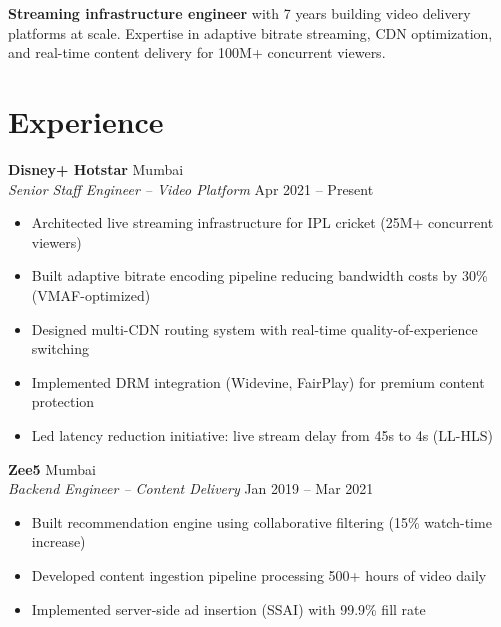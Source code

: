 \documentclass[10pt,letterpaper]{article}
\begin{document}
\\[3pt]
\\[6pt]

\vspace{8pt}
\noindent\colorbox{lightred}{\parbox{\dimexpr\linewidth-2\fboxsep}{\small
\textbf{Streaming infrastructure engineer} with 7 years building video delivery platforms at scale. Expertise in adaptive bitrate streaming, CDN optimization, and real-time content delivery for 100M+ concurrent viewers.}}

\section{Experience}

\textbf{Disney+ Hotstar} \hfill Mumbai\\
\textit{Senior Staff Engineer -- Video Platform} \hfill Apr 2021 -- Present
\begin{itemize}
\item Architected live streaming infrastructure for IPL cricket (25M+ concurrent viewers)
\item Built adaptive bitrate encoding pipeline reducing bandwidth costs by 30\% (VMAF-optimized)
\item Designed multi-CDN routing system with real-time quality-of-experience switching
\item Implemented DRM integration (Widevine, FairPlay) for premium content protection
\item Led latency reduction initiative: live stream delay from 45s to 4s (LL-HLS)
\end{itemize}

\textbf{Zee5} \hfill Mumbai\\
\textit{Backend Engineer -- Content Delivery} \hfill Jan 2019 -- Mar 2021
\begin{itemize}
\item Built recommendation engine using collaborative filtering (15\% watch-time increase)
\item Developed content ingestion pipeline processing 500+ hours of video daily
\item Implemented server-side ad insertion (SSAI) with 99.9\% fill rate
\end{itemize}
\end{document}
